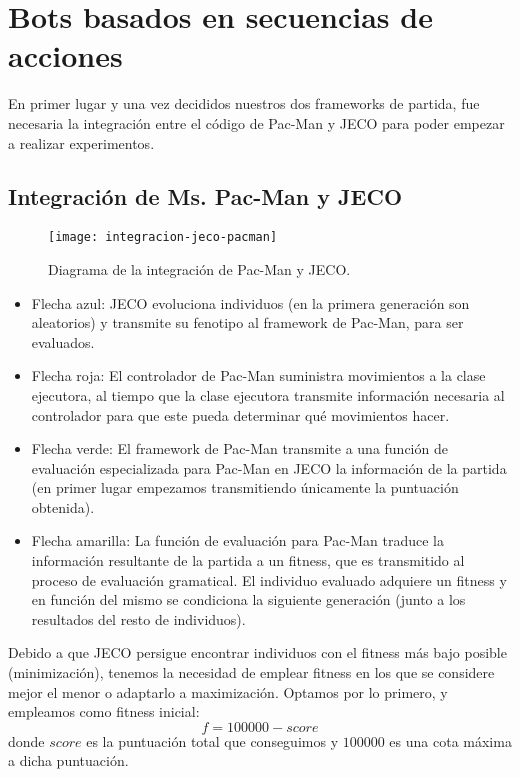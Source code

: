 \chapter{Bots basados en secuencias de acciones} \label{cap:bots-secuencia-acciones}
En primer lugar y una vez decididos nuestros dos frameworks de partida, fue necesaria la integración entre el código de Pac-Man y JECO para poder empezar a realizar experimentos.

\section{Integración de Ms. Pac-Man y JECO}
\begin{figure}[H]
\centering
\texttt{[image: integracion-jeco-pacman]}
\caption{Diagrama de la integración de Pac-Man y JECO.}
\end{figure}
\begin{itemize}
\item Flecha azul: JECO evoluciona individuos (en la primera generación son aleatorios) y transmite su fenotipo al framework de Pac-Man, para ser evaluados.

\item Flecha roja: El controlador de Pac-Man suministra movimientos a la clase ejecutora, al tiempo que la clase ejecutora transmite información necesaria al controlador para que este pueda determinar qué movimientos hacer.

\item Flecha verde: El framework de Pac-Man transmite a una función de evaluación especializada para Pac-Man en JECO la información de la partida (en primer lugar empezamos transmitiendo únicamente la puntuación obtenida).

\item Flecha amarilla: La función de evaluación para Pac-Man traduce la información resultante de la partida a un fitness, que es transmitido al proceso de evaluación gramatical. El individuo evaluado adquiere un fitness y en función del mismo se condiciona la siguiente generación (junto a los resultados del resto de individuos).
\end{itemize}

Debido a que JECO persigue encontrar individuos con el fitness más bajo posible (minimización), tenemos la necesidad de emplear fitness en los que se considere mejor el menor o adaptarlo a maximización. Optamos por lo primero, y empleamos como fitness inicial:
\begin{equation*}
f = 100000 - score
\end{equation*}
donde $score$ es la puntuación total que conseguimos y $100000$ es una cota máxima a dicha puntuación.


